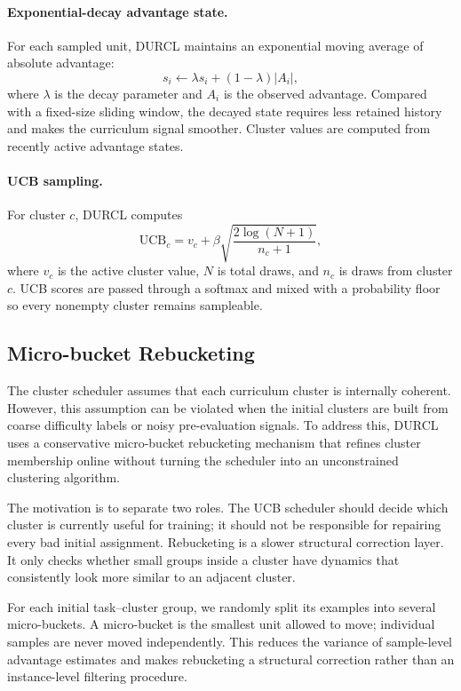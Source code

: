 \documentclass[10pt]{article}
\begin{document}
\paragraph{Exponential-decay advantage state.}
For each sampled unit, DURCL maintains an exponential moving average of absolute advantage:
\begin{equation}
s_i \leftarrow \lambda s_i + (1-\lambda)|A_i|,
\end{equation}
where $\lambda$ is the decay parameter and $A_i$ is the observed advantage. Compared with a fixed-size sliding window, the decayed state requires less retained history and makes the curriculum signal smoother. Cluster values are computed from recently active advantage states.

\paragraph{UCB sampling.}
For cluster $c$, DURCL computes
\begin{equation}
\mathrm{UCB}_c = v_c + \beta \sqrt{\frac{2\log(N+1)}{n_c+1}},
\end{equation}
where $v_c$ is the active cluster value, $N$ is total draws, and $n_c$ is draws from cluster $c$. UCB scores are passed through a softmax and mixed with a probability floor so every nonempty cluster remains sampleable.

\subsection{Micro-bucket Rebucketing}

The cluster scheduler assumes that each curriculum cluster is internally coherent. However, this assumption can be violated when the initial clusters are built from coarse difficulty labels or noisy pre-evaluation signals. To address this, DURCL uses a conservative micro-bucket rebucketing mechanism that refines cluster membership online without turning the scheduler into an unconstrained clustering algorithm.

The motivation is to separate two roles. The UCB scheduler should decide which cluster is currently useful for training; it should not be responsible for repairing every bad initial assignment. Rebucketing is a slower structural correction layer. It only checks whether small groups inside a cluster have dynamics that consistently look more similar to an adjacent cluster.

For each initial task--cluster group, we randomly split its examples into several micro-buckets. A micro-bucket is the smallest unit allowed to move; individual samples are never moved independently. This reduces the variance of sample-level advantage estimates and makes rebucketing a structural correction rather than an instance-level filtering procedure.
\end{document}
